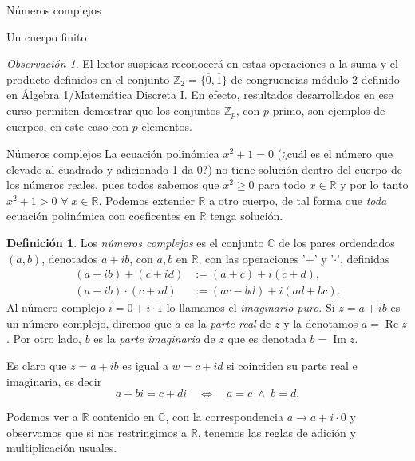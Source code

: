 \documentclass[a4paper,12pt,twoside,spanish]{amsbook}
\theoremstyle{definition}
\newtheorem{definicion}{Definici\'on}[section]
\theoremstyle{remark}
\newtheorem{obs}{Observaci\'on}[section]
\newcommand{\R}{\mathbb R}
\newcommand{\C}{\mathbb C}
\newcommand{\Z}{\mathbb Z}
\begin{document}
\begin{chapter}{Números complejos}
\begin{subsection}{Un cuerpo finito}
		\begin{obs}
			El lector suspicaz reconocerá en estas operaciones a la suma y el producto definidos en el conjunto $\Z_2=\{\overline{0},\overline{1}\}$ de congruencias módulo 2  definido en Álgebra 1/Matemática Discreta I. En efecto, resultados desarrollados en ese curso permiten demostrar que los conjuntos $\Z_p$, con $p$ primo, son ejemplos de cuerpos, en este caso con $p$ elementos.
		\end{obs}
		
	\end{subsection}
	
	
	\begin{section}{Números complejos}
		La ecuación polinómica $x^2 + 1 =0$ (¿cuál es el número que elevado  al cuadrado y adicionado 1 da 0?) no tiene solución dentro del cuerpo de los números reales,  pues todos sabemos que  $x^2 \ge 0$ para todo $x \in \R$ y por lo tanto $x^2 + 1 >0$ $\forall\; x \in \R$. Podemos extender $\R$ a otro cuerpo,  de tal forma que \textit{toda} ecuación polinómica con coeficentes en $\R$ tenga solución. 
		
		\begin{definicion} 
			Los \textit{números complejos} es el conjunto $\C$  de los pares ordendados $(a,b)$,  denotados $a+ib$, con $a, b$  en $\R$, con las operaciones '$+$' y '$\cdot$', definidas
			\begin{align}
			(a+ib)+ (c+id) &:= (a+c) + i(c+d), \label{sumacompleja} \\
			(a+ib) \cdot (c+id) &:= (ac -bd) + i(ad+bc). \label{productocomplejo}
			\end{align}
			Al número complejo $i = 0 + i\cdot 1$ lo llamamos el \textit{imaginario puro}.  Si $z= a + ib$  es un número complejo,  diremos que $a$ es la \textit{parte real} de $z$ y  la denotamos $a = \operatorname{Re} z$. Por otro lado,  $b$ es la \textit{parte  imaginaria} de $z$ que es denotada $b = \operatorname{Im} z$.
		\end{definicion}
		
		Es claro  que $z=a+ib$ es igual a $w = c+id$ si coinciden su parte real e imaginaria, es decir
		\begin{equation*}
		a+ bi = c+ di\quad \Leftrightarrow\quad a=c \;\wedge\; b = d.
		\end{equation*}
		
		Podemos  ver a $\R$ contenido en $\C$,  con la correspondencia $a \to a + i \cdot 0$ y  observamos que si  nos restringimos a $\R$, tenemos las reglas de adición y  multiplicación usuales.  
		

\end{section}
\end{chapter}
\end{document}
